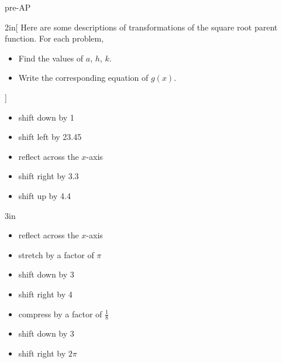 \begin{taggedblock}{pre-AP}
\begin{my2Problems}[\normalsize]{2in}[%
    Here are some descriptions of transformations of the square root parent function.
    For each problem, 
    \vspace{-1em}
    \begin{itemize}[nosep]
        \item Find the values of $a$, $h$, $k$. 
        \item Write the corresponding equation of $g(x)$.
    \end{itemize}
    ]
    {
        \begin{itemize}[nosep]
            \item shift down by 1
            \item shift left by 23.45
        \end{itemize}
    }
    {
        \begin{itemize}[nosep]
            \item reflect across the $x$-axis
            \item shift right by 3.3
            \item shift up by 4.4
        \end{itemize}
    }
\end{my2Problems}
\begin{my2Problems}[\normalsize]{3in}
    {
        \begin{itemize}[nosep]
            \item reflect across the $x$-axis
            \item stretch by a factor of $\pi$
            \item shift down by 3
            \item shift right by 4
        \end{itemize}
    }
    {
        \begin{itemize}[nosep]
            \item compress by a factor of $\frac{1}{8}$
            \item shift down by 3
            \item shift right by $2\pi$
        \end{itemize}
    }
\end{my2Problems}


\end{taggedblock}

